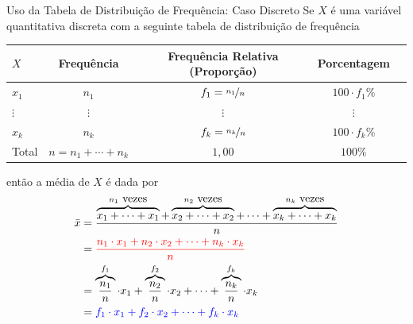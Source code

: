 \documentclass[8pt]{beamer}
\begin{document}
\begin{frame}{Uso da Tabela de Distribuição de Frequência: Caso Discreto}
 Se $X$ é uma variável quantitativa discreta com a seguinte tabela de distribuição de frequência
 
 {\tiny
  \begin{table}
   \centering
   \begin{tabular}{l|cccc}
    \toprule[0.05cm]
    $X$ & Frequência & Frequência Relativa (Proporção) & Porcentagem\\
    \midrule[0.05cm]
    $x_1$ & $n_1$ & $f_1=\nicefrac{n_1}{n}$ & $100\cdot f_1\%$\\ \hline
    $\vdots$ & $\vdots$ & $\vdots$ & $\vdots$ \\ \hline
    $x_k$ & $n_k$ & $f_k=\nicefrac{n_k}{n}$ & $100\cdot f_k\%$\\ \midrule[0.05cm]
    Total & $n=n_1+\cdots+n_k$ & $1,00$ & $100\%$\\ \bottomrule[0.05cm]
   \end{tabular}
  \end{table}
 }
 
 então a média de $X$ é dada por
 \begin{align*}
  \bar{x} &= \dfrac{ \overbrace{x_1+\cdots+x_1}^{n_1\mbox{ vezes}} + \overbrace{x_2+\cdots+x_2}^{n_2\mbox{ vezes}} + \cdots + \overbrace{x_k+\cdots+x_k}^{n_k\mbox{ vezes}} }{n}\\
  &= {\color{red} \dfrac{n_1 \cdot x_1 + n_2 \cdot x_2 + \cdots + n_k \cdot x_k}{n}} \\
  &= \overbrace{\dfrac{n_1}{n}}^{f_1} \cdot x_1 + \overbrace{\dfrac{n_2}{n}}^{f_2} \cdot x_2 + \cdots + \overbrace{\dfrac{n_k}{n}}^{f_k} \cdot x_k \\
  &= {\color{blue} f_1 \cdot x_1 + f_2 \cdot x_2 + \cdots + f_k \cdot x_k}
 \end{align*}

 
\end{frame}
\end{document}
